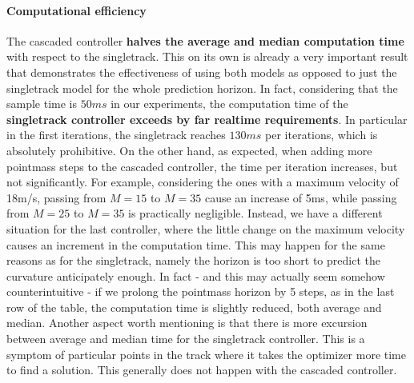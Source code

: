 \documentclass[a4paper, onecolumn, 11pt]{article}
\begin{document}
\paragraph{Computational efficiency}
The cascaded controller \textbf{halves the average and median computation time}
with respect to the singletrack. This on its own is already a very important
result that demonstrates the effectiveness of using both models as opposed to
just the singletrack model for the whole prediction horizon. In fact,
considering that the sample time is $50ms$ in our experiments, the computation
time of the \textbf{singletrack controller exceeds by far realtime
requirements}. In particular in the first iterations, the singletrack reaches
$130ms$ per iterations, which is absolutely prohibitive. On the other hand, as
expected, when adding more pointmass steps to the cascaded controller, the time
per iteration increases, but not significantly. For example, considering the
ones with a maximum velocity of 18m/s, passing from $M=15$ to $M=35$ cause an
increase of 5ms, while passing from $M=25$ to $M=35$ is practically negligible.
Instead, we have a different situation for the last controller, where the little
change on the maximum velocity causes an increment in the computation time. This
may happen for the same reasons as for the singletrack, namely the horizon is
too short to predict the curvature anticipately enough. In fact - and this may
actually seem somehow counterintuitive - if we prolong the pointmass horizon by 5
steps, as in the last row of the table, the computation time is slightly
reduced, both average and median. Another aspect worth mentioning is that there
is more excursion between average and median time for the singletrack
controller. This is a symptom of particular points in the track where it takes
the optimizer more time to find a solution. This generally does not happen with
the cascaded controller.
\end{document}
